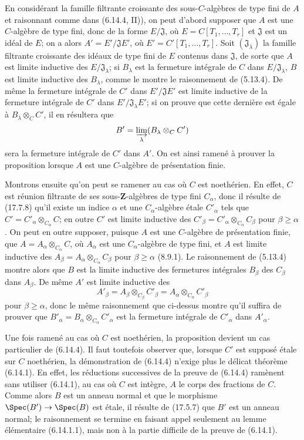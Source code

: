 En considérant la famille filtrante croissante des sous-$C$-algèbres de type fini de $A$ et raisonnant comme dans (6.14.4, II)), on peut d'abord supposer que $A$ est une $C$-algèbre de type fini, donc de la forme $E/\mathfrak J$, où $E=C[T_1,\ldots,T_r]$ et $\mathfrak J$ est un idéal de $E$; on a alors $A'=E'/\mathfrak JE'$, où $E'=C'[T_1,\ldots,T_r]$. Soit $(\mathfrak J_\lambda)$ la famille filtrante croissante des idéaux de type fini de $E$ contenus dans $\mathfrak J$, de sorte que $A$ est limite inductive des $E/\mathfrak J_\lambda$; si $B_\lambda$ est la fermeture intégrale de $C$ dans $E/\mathfrak J_\lambda$, $B$ est limite inductive des $B_\lambda$, comme le montre le raisonnement de (5.13.4). De même la fermeture intégrale de $C'$ dans $E'/\mathfrak JE'$ est limite inductive de la fermeture intégrale de $C'$ dans $E'/\mathfrak J_\lambda E'$; si on prouve que cette dernière est égale à $B_\lambda\otimes_C C'$, il en résultera que
\[
  B'=\varinjlim_\lambda(B_\lambda\otimes_C C')
\]
sera la fermeture intégrale de $C'$ dans $A'$. On est ainsi ramené à prouver la proposition lorsque $A$ est une $C$-algèbre de présentation finie.

Montrons ensuite qu'on peut se ramener au cas où $C$ est noethérien. En effet, $C$ est réunion filtrante de ses sous-$\mathbf Z$-algèbres de type fini $C_\alpha$, donc il résulte de (17.7.8) qu'il existe un indice $\alpha$ et une $C_\alpha$-algèbre étale $C'_\alpha$ tels que $C'=C'_\alpha\otimes_{C_\alpha}C$; en outre $C'$ est limite inductive des $C'_\beta=C'_\alpha\otimes_{C_\alpha}C_\beta$ pour $\beta\geq\alpha$. On peut en outre supposer, puisque $A$ est une $C$-algèbre de présentation finie, que $A=A_\alpha\otimes_{C_\alpha}C$, où $A_\alpha$ est une $C_\alpha$-algèbre de type fini, et $A$ est limite inductive des $A_\beta=A_\alpha\otimes_{C_\alpha}C_\beta$ pour $\beta\geq\alpha$ (8.9.1). Le raisonnement de (5.13.4) montre alors que $B$ est la limite inductive des fermetures intégrales $B_\beta$ des $C_\beta$ dans $A_\beta$. De même $A'$ est limite inductive des
\[
  A'_\beta=A_\beta\otimes_{C_\beta}C'_\beta=A_\alpha\otimes_{C_\alpha}C'_\beta
\]
pour $\beta\geq\alpha$, donc le même raisonnement que ci-dessus montre qu'il suffira de prouver que $B'_\alpha=B_\alpha\otimes_{C_\alpha}C'_\alpha$ est la fermeture intégrale de $C'_\alpha$ dans $A'_\alpha$.

Une fois ramené au cas où $C$ est noethérien, la proposition devient un cas particulier de (6.14.4). Il faut toutefois observer que, lorsque $C'$ est supposé étale sur $C$ noethérien, la démonstration de (6.14.4) n'exige plus le délicat théorème (6.14.1). En effet, les réductions successives de la preuve de (6.14.4) ramènent sans utiliser (6.14.1), au cas où $C$ est intègre, $A$ le corps des fractions de $C$. Comme alors $B$ est un anneau normal et que le morphisme $\Spec(B')\to\Spec(B)$ est étale, il résulte de (17.5.7) que $B'$ est un anneau normal; le raisonnement se termine en faisant appel seulement au lemme élémentaire (6.14.1.1), mais non à la partie difficile de la preuve de (6.14.1).


